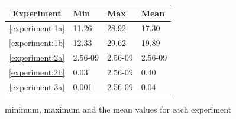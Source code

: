 \documentclass{article}
\begin{document}
\begin{figure}[!htbp]
\begin{tabular}{||c|||l|l|l||}
  \hline
  Experiment & Min & Max & Mean \\ \hline \hline
  \ref{experiment:1a} & 11.26 & 28.92 & 17.30 \\ \hline
  \ref{experiment:1b} & 12.33 & 29.62 & 19.89 \\ \hline
  \ref{experiment:2a} & 2.56-09 & 2.56-09 & 2.56-09 \\ \hline
  \ref{experiment:2b} & 0.03 & 2.56-09 & 0.40 \\ \hline
  \ref{experiment:3a} & 0.001 & 2.56-09 & 0.04 \\ \hline
\end{tabular}
\caption{minimum, maximum and the mean values for each experiment}
\end{figure}
\FloatBarrier
\end{document}
